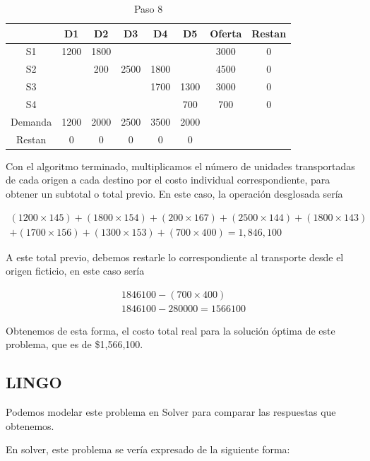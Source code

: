 \documentclass[12pt]{article}  %
\begin{document}
\begin{table}[H]
\centering
\caption{Paso 8}
\label{tab:Paso8Prob5}
\begin{tabular}{c|ccccc|cc}
& D1 & D2 & D3 & D4 & D5 & Oferta & Restan\\
\hline
S1 & 1200 & 1800 &  &  &  & 3000 & 0 \\
S2 &  & 200 & 2500 & 1800 &  & 4500 & 0 \\
S3 &  &  &  & 1700 & 1300 & 3000 & 0 \\
S4 &  &  &  &  & \cellcolor{yellow}700 & 700 &0 \\
\hline
Demanda & 1200 & 2000 & 2500 & 3500 & 2000 & & \\
Restan & 0 & 0 & 0 & 0 & 0 &&
\end{tabular}
\end{table}

Con el algoritmo terminado, multiplicamos el número de unidades transportadas de cada origen a cada destino por el costo individual correspondiente, para obtener un subtotal o total previo. En este caso, la operación desglosada sería

\begin{align*}
(1200 \times 145) + (1800 \times 154) + (200 \times 167) + (2500 \times 144) + (1800 \times 143) \\
+ (1700 \times 156) + (1300 \times 153) + (700 \times 400) = 1,846,100
\end{align*}

A este total previo, debemos restarle lo correspondiente al transporte desde el origen ficticio, en este caso sería

\begin{align}
1846100 - (700 \times 400) \\ 
1846100 - 280000 = 1566100
\end{align}

Obtenemos de esta forma, el costo total real para la solución óptima de este problema, que es de \$1,566,100.

\subsection{LINGO}
Podemos modelar este problema en Solver para comparar las respuestas que obtenemos.

En solver, este problema se vería expresado de la siguiente forma:
\end{document}

